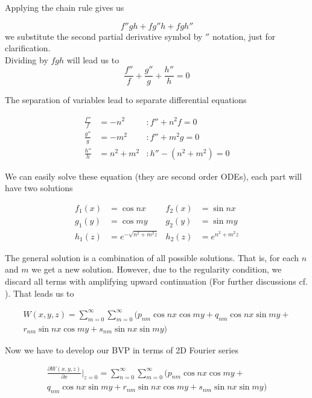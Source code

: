 Applying the chain rule gives us

\begin{equation}
f''gh + fg''h + fgh''
\end{equation}
we substitute the second partial derivative symbol by $''$ notation, just for clarification. 
\\
Dividing by $fgh$ will lead us to
\begin{equation}
\frac{f''}{f} + \frac{g''}{g} + \frac{h''}{h} = 0
\end{equation}

The separation of variables lead to separate differential equations

\begin{align}
\frac{f''}{f} &= -n^2 &: f'' + n^2f = 0 \\
\frac{g''}{g} &= -m^2 &: f'' + m^2g = 0 \\
\frac{h''}{h} &= n^2+m^2 &: h'' - (n^2+m^2) = 0
\end{align}

We can easily solve these equation (they are second order ODEs), each part will have two solutions

\begin{align*}
f_1(x) &= \cos nx  &f_2(x) &= \sin nx\\
g_1(y) &= \cos my  &g_2(y) &= \sin my \\
h_1(z) &= e^{-\sqrt{n^2+m^2z}}  &h_2(z) &= e^{n^2 + m^2z}
\end{align*}

The general solution is a combination of all possible solutions. That is, for each $n$ and $m$ we get a new solution. However, due to the regularity condition, we discard all terms with amplifying upward continuation (For further discussions cf. \cite{lnerdm}). That leads us to

\begin{multline}
W(x,y,z) = \sum_{m=0}^{\infty}\sum_{m=0}^{\infty} (p_{nm} \cos nx \cos my + q_{nm} \cos nx \sin my +\\ r_{nm} \sin nx \cos my + s_{nm} \sin nx \sin my)
\end{multline}

Now we have to develop our BVP in terms of 2D Fourier series

\begin{multline}
\frac{\partial W (x,y,z)}{\partial x}\Big|_{z=0} = \sum_{n=0}^{\infty}\sum_{m=0}^{\infty} (p_{nm} \cos nx \cos my +\\ q_{nm} \cos nx \sin my + r_{nm} \sin nx \cos my + s_{nm} \sin nx \sin my)
\end{multline}


